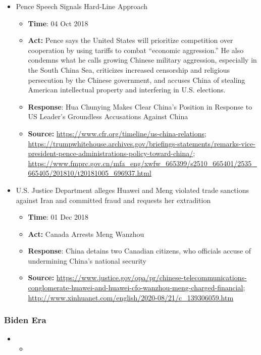\documentclass[12pt]{article} %
\begin{document}
\begin{itemize}
			\item	Pence Speech Signals Hard-Line Approach
				\begin{itemize}
				\item \textbf{Time}: 04 Oct 2018
				\item \textbf{Act:} Pence says the United States will prioritize competition over cooperation by using tariffs to combat “economic aggression.” He also condemns what he calls growing Chinese military aggression, especially in the South China Sea, criticizes increased censorship and religious persecution by the Chinese government, and accuses China of stealing American intellectual property and interfering in U.S. elections.
				\item \textbf{Response}: Hua Chunying Makes Clear China's Position in Response to US Leader's Groundless Accusations Against China
				\item	\textbf{Source:} \url{https://www.cfr.org/timeline/us-china-relations}; \url{https://trumpwhitehouse.archives.gov/briefings-statements/remarks-vice-president-pence-administrations-policy-toward-china/}; \url{https://www.fmprc.gov.cn/mfa_eng/xwfw_665399/s2510_665401/2535_665405/201810/t20181005_696937.html}
				\end{itemize}
			
			\item U.S. Justice Department alleges Huawei and Meng violated trade sanctions against Iran and committed fraud and requests her extradition
				\begin{itemize}
				\item \textbf{Time}: 01 Dec 2018
				\item \textbf{Act:} Canada Arrests Meng Wanzhou
				\item \textbf{Response}: China detains two Canadian citizens, who officials accuse of undermining China’s national security
				\item	\textbf{Source:} \url{https://www.justice.gov/opa/pr/chinese-telecommunications-conglomerate-huawei-and-huawei-cfo-wanzhou-meng-charged-financial}; \url{http://www.xinhuanet.com/english/2020-08/21/c_139306059.htm}
				\end{itemize}
		
				
			\end{itemize}
		\subsubsection{Biden Era}
			\begin{itemize}
			\item	
				\begin{itemize}
				\item	
				\end{itemize}
			\end{itemize}
			
\end{document}
